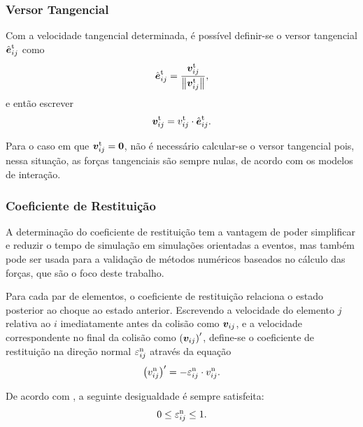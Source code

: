 \subsubsection*{Versor Tangencial}

Com a velocidade tangencial determinada, é possível definir-se o versor tangencial \({\hat{\bm{e}}}_{i j}^{\text{t}}\) como
\begin{equation*}
	{\hat{\bm{e}}}_{i j}^{\text{t}} = \dfrac{{\bm{v}}_{i j}^{\text{t}}}{\norm{{\bm{v}}_{i j}^{\text{t}}}},
\end{equation*}
e então escrever
\begin{equation*}
	{\bm{v}}_{i j}^{\text{t}} = {v}_{i j}^{\text{t}}\cdot {\hat{\bm{e}}}_{i j}^{\text{t}}.
\end{equation*}

Para o caso em que \({\bm{v}}_{i j}^{\text{t}} = \bm{0}\), não é necessário calcular-se o versor tangencial pois, nessa situação, as forças tangenciais são sempre nulas, de acordo com os modelos de interação.

\subsubsection*{Coeficiente de Restituição} 

A determinação do coeficiente de restituição tem a vantagem de poder simplificar e reduzir o tempo de simulação em simulações orientadas a eventos, mas também pode ser usada para a validação de métodos numéricos baseados no cálculo das forças, que são o foco deste trabalho.

Para cada par de elementos, o coeficiente de restituição relaciona o estado posterior ao choque ao estado anterior. Escrevendo a velocidade do elemento \(j\) relativa ao \(i\) imediatamente antes da colisão como \({\bm{v}}_{i j}\), e a velocidade correspondente no final da colisão como \(\afterCollision{\relativeVelocityContactPointij}\), define-se o coeficiente de restituição na direção normal \({\varepsilon}_{i j}^{\text{n}}\) através da equação
\begin{equation*}
	\afterCollision{\relativeNormalVelocityScalarij} = - \normalCoefficientOfRestitutionij\cdot\beforeCollision{\relativeNormalVelocityScalarij}.
\end{equation*}

De acordo com , a seguinte desigualdade é sempre satisfeita:
\begin{equation*}
	0 \leq {\varepsilon}_{i j}^{\text{n}} \leq 1.
\end{equation*}

